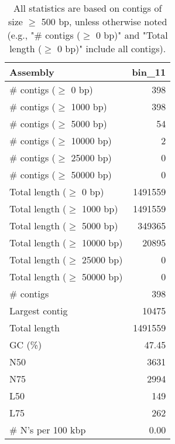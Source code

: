 \documentclass[12pt,a4paper]{article}
\begin{document}
\begin{table}[ht]
\begin{center}
\caption{All statistics are based on contigs of size $\geq$ 500 bp, unless otherwise noted (e.g., "\# contigs ($\geq$ 0 bp)" and "Total length ($\geq$ 0 bp)" include all contigs).}
\begin{tabular}{|l*{1}{|r}|}
\hline
Assembly & bin\_11 \\ \hline
\# contigs ($\geq$ 0 bp) & 398 \\ \hline
\# contigs ($\geq$ 1000 bp) & 398 \\ \hline
\# contigs ($\geq$ 5000 bp) & 54 \\ \hline
\# contigs ($\geq$ 10000 bp) & 2 \\ \hline
\# contigs ($\geq$ 25000 bp) & 0 \\ \hline
\# contigs ($\geq$ 50000 bp) & 0 \\ \hline
Total length ($\geq$ 0 bp) & 1491559 \\ \hline
Total length ($\geq$ 1000 bp) & 1491559 \\ \hline
Total length ($\geq$ 5000 bp) & 349365 \\ \hline
Total length ($\geq$ 10000 bp) & 20895 \\ \hline
Total length ($\geq$ 25000 bp) & 0 \\ \hline
Total length ($\geq$ 50000 bp) & 0 \\ \hline
\# contigs & 398 \\ \hline
Largest contig & 10475 \\ \hline
Total length & 1491559 \\ \hline
GC (\%) & 47.45 \\ \hline
N50 & 3631 \\ \hline
N75 & 2994 \\ \hline
L50 & 149 \\ \hline
L75 & 262 \\ \hline
\# N's per 100 kbp & 0.00 \\ \hline
\end{tabular}
\end{center}
\end{table}
\end{document}
